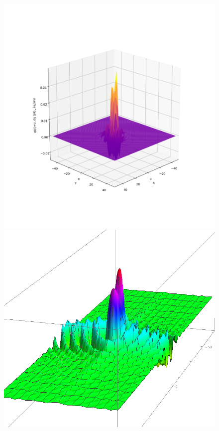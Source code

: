 \documentclass{article}
\theoremstyle{definition}
\begin{document}
\begin{figure}[!htb]
	\centering
	\includegraphics[scale=0.35]{conv}
	\includegraphics[scale=0.25]{conv-1}\\

\end{figure}
\end{document}
